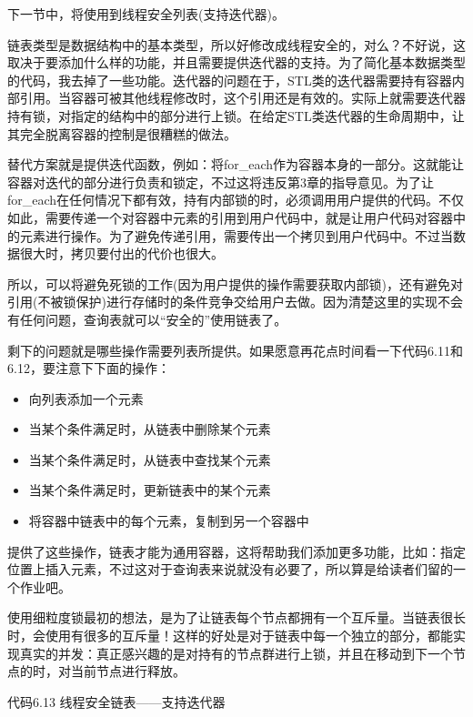 下一节中，将使用到线程安全列表(支持迭代器)。


链表类型是数据结构中的基本类型，所以好修改成线程安全的，对么？不好说，这取决于要添加什么样的功能，并且需要提供迭代器的支持。为了简化基本数据类型的代码，我去掉了一些功能。迭代器的问题在于，STL类的迭代器需要持有容器内部引用。当容器可被其他线程修改时，这个引用还是有效的。实际上就需要迭代器持有锁，对指定的结构中的部分进行上锁。在给定STL类迭代器的生命周期中，让其完全脱离容器的控制是很糟糕的做法。

替代方案就是提供迭代函数，例如：将for\_each作为容器本身的一部分。这就能让容器对迭代的部分进行负责和锁定，不过这将违反第3章的指导意见。为了让for\_each在任何情况下都有效，持有内部锁的时，必须调用用户提供的代码。不仅如此，需要传递一个对容器中元素的引用到用户代码中，就是让用户代码对容器中的元素进行操作。为了避免传递引用，需要传出一个拷贝到用户代码中。不过当数据很大时，拷贝要付出的代价也很大。

所以，可以将避免死锁的工作(因为用户提供的操作需要获取内部锁)，还有避免对引用(不被锁保护)进行存储时的条件竞争交给用户去做。因为清楚这里的实现不会有任何问题，查询表就可以“安全的”使用链表了。

剩下的问题就是哪些操作需要列表所提供。如果愿意再花点时间看一下代码6.11和6.12，要注意下下面的操作：

\begin{itemize}
  \item 向列表添加一个元素
  \item 当某个条件满足时，从链表中删除某个元素
  \item 当某个条件满足时，从链表中查找某个元素
  \item 当某个条件满足时，更新链表中的某个元素
  \item 将容器中链表中的每个元素，复制到另一个容器中
\end{itemize}

提供了这些操作，链表才能为通用容器，这将帮助我们添加更多功能，比如：指定位置上插入元素，不过这对于查询表来说就没有必要了，所以算是给读者们留的一个作业吧。

使用细粒度锁最初的想法，是为了让链表每个节点都拥有一个互斥量。当链表很长时，会使用有很多的互斥量！这样的好处是对于链表中每一个独立的部分，都能实现真实的并发：真正感兴趣的是对持有的节点群进行上锁，并且在移动到下一个节点的时，对当前节点进行释放。

代码6.13 线程安全链表——支持迭代器

